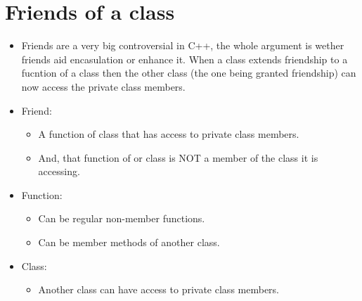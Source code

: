 \section{Friends of a class}
\begin{itemize}
    \item Friends are a very big controversial in C++, the whole argument is wether friends aid encasulation or enhance it. When a class extends friendship to a fucntion of a class then the other class (the one being granted friendship) can now access the private class members.
    \item Friend:
        \begin{itemize}
            \item A function of class that has access to private class members.
            \item And, that function of or class is NOT a member of the class it is accessing.
        \end{itemize}
    
    \item Function:
        \begin{itemize}
            \item Can be regular non-member functions.
            \item Can be member methods of another class.
        \end{itemize}
    
    \item Class:
        \begin{itemize}
            \item Another class can have access to private class members.
        \end{itemize}
\end{itemize}

